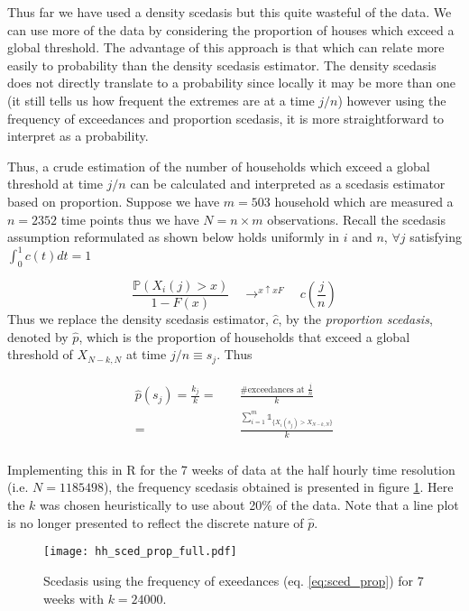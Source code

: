 Thus far we have used a density scedasis but this quite wasteful of the data. We can use more of the data by considering the proportion of houses which exceed a global threshold. The advantage of this approach is that which can relate more easily to probability than the density scedasis estimator. The density scedasis does not directly translate to a probability since locally it may be more than one (it still tells us how frequent the extremes are at a time $j/n$) however using the frequency of exceedances and proportion scedasis, it is more straightforward to interpret as a probability.

Thus, a crude estimation of the number of households which exceed a global threshold at time $j/n$ can be calculated and interpreted as a scedasis estimator based on proportion. Suppose we have $m = 503 $ household which are measured a $n = 2352$ time points thus we have $N= n \times m$ observations. Recall the scedasis assumption reformulated as shown below holds uniformly in $i$ and $n$, $\forall j$ satisfying $\int_0^1 c(t)dt = 1$

\begin{equation*}
\frac{\mathbb{P}(X_i(j)>x)}{1-F(x)} \quad  \displaystyle{ \mathop{\rightarrow}^{x \uparrow xF}} \quad c\left(\frac{j}{n}\right)
\end{equation*}
\noindent Thus we replace the density scedasis estimator, $\hat{c}$, by the \textit{proportion scedasis}, denoted by $\hat{p}$, which is the proportion of households that exceed a global threshold of $X_{N-k,N}$ at time $j/n \equiv s_j$. Thus

\begin{align} \label{eq:sced_prop}
\begin{split}
\hat{p}(s_j) =  \frac{k_j}{k} =& \quad \frac{\# \text{exceedances at } \frac{j}{n}}{k} \\
= & \quad \frac{\sum_{i=1}^m \mathbb{1}_{\{X_i(s_j) > X_{N-k,N}\}}}{k}\\
\end{split}
\end{align}

Implementing this in R for the 7 weeks of data at the half hourly time resolution (i.e. $N = 1185498$), the frequency scedasis obtained is presented in figure \ref{fig:hh_sced_prop}. Here the $k$ was chosen heuristically to use about 20\% of the data. Note that a line plot is no longer presented to reflect the discrete nature of $\hat{p}$.

\begin{figure}
\centering
\texttt{[image: hh\_sced\_prop\_full.pdf]}
\caption{\label{fig:hh_sced_prop} Scedasis using the frequency of exeedances (eq. \ref{eq:sced_prop}) for 7 weeks with $k=24000$.}
\end{figure}

